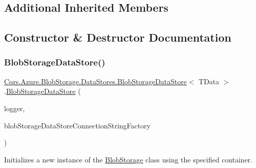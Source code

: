 \subsection*{Additional Inherited Members}


\subsection{Constructor \& Destructor Documentation}
\mbox{\label{classCqrs_1_1Azure_1_1BlobStorage_1_1DataStores_1_1BlobStorageDataStore_aacea885f6a1d38921b99feb898fc33c2_aacea885f6a1d38921b99feb898fc33c2}} 
\subsubsection{\texorpdfstring{Blob\+Storage\+Data\+Store()}{BlobStorageDataStore()}}
{\footnotesize\ttfamily \hyperlink{classCqrs_1_1Azure_1_1BlobStorage_1_1DataStores_1_1BlobStorageDataStore}{Cqrs.\+Azure.\+Blob\+Storage.\+Data\+Stores.\+Blob\+Storage\+Data\+Store}$<$ T\+Data $>$.\hyperlink{classCqrs_1_1Azure_1_1BlobStorage_1_1DataStores_1_1BlobStorageDataStore}{Blob\+Storage\+Data\+Store} (\begin{DoxyParamCaption}\item[{I\+Logger}]{logger,  }\item[{\hyperlink{interfaceCqrs_1_1Azure_1_1BlobStorage_1_1DataStores_1_1IBlobStorageDataStoreConnectionStringFactory}{I\+Blob\+Storage\+Data\+Store\+Connection\+String\+Factory}}]{blob\+Storage\+Data\+Store\+Connection\+String\+Factory }\end{DoxyParamCaption})}



Initializes a new instance of the \hyperlink{namespaceCqrs_1_1Azure_1_1BlobStorage}{Blob\+Storage} class using the specified container. 



